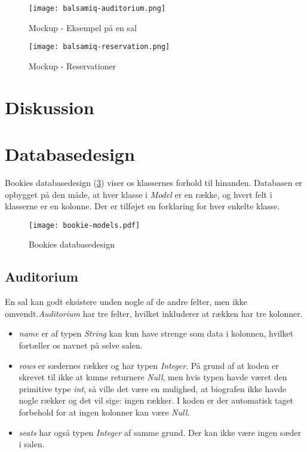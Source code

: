 \begin{figure}[h]
  \centering
  \texttt{[image: balsamiq-auditorium.png]}
  \caption{Mockup - Eksempel på en sal}
  \label{mockup: balsamiq-auditorium}
\end{figure}

\begin{figure}[h]
  \centering
  \texttt{[image: balsamiq-reservation.png]}
  \caption{Mockup - Reservationer}
  \label{mockup: balsamiq-reservation}
\end{figure}

\section{Diskussion}

\section{Databasedesign}

Bookies databasedesign (\ref{class-diagram: bookie-models}) viser os klassernes forhold til hinanden. Databasen er opbygget på den måde, at hver klasse i \textit{Model} er en række, og hvert felt i klasserne er en kolonne. Der er tilføjet en forklaring for hver enkelte klasse.

\begin{figure}[h]
  \centering
  \texttt{[image: bookie-models.pdf]}
  \caption{Bookies databasedesign}
  \label{class-diagram: bookie-models}
\end{figure}

\subsection{Auditorium}

En sal kan godt eksistere unden nogle af de andre felter, men ikke omvendt.\textit{Auditorium} har tre felter, hvilket inkluderer at rækken har tre kolonner.
\begin{itemize}

  \item \textit{name} er af typen \textit{String} kan kun have strenge som data i kolonnen, hvilket fortæller os navnet på selve salen.
  \item \textit{rows} er sædernes rækker og har typen \textit{Integer}. På grund af at koden er skrevet til ikke at kunne returnere \textit{Null}, men hvis typen havde været den primitive type \textit{int}, så ville det være en mulighed, at biografen ikke havde nogle rækker og det vil sige: ingen rækker. I koden er der automatisk taget forbehold for at ingen kolonner kan være \textit{Null}.
  \item \textit{seats} har også typen \textit{Integer} af samme grund. Der kan ikke være ingen sæder i salen.

\end{itemize}

